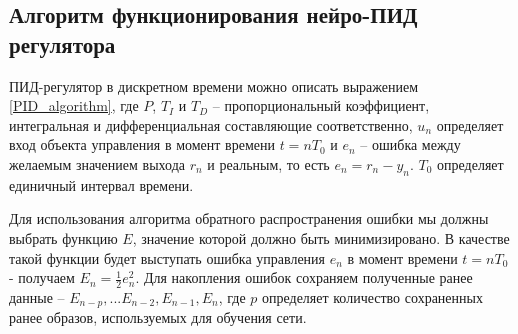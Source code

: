 \subsection{Алгоритм функционирования нейро-ПИД регулятора}

ПИД-регулятор в дискретном времени можно описать выражением \ref{PID_algorithm}, где $P$, $T_I$ и $T_D$ – пропорциональный коэффициент, интегральная и дифференциальная составляющие соответственно, $u_n$ определяет вход объекта управления в момент времени $t = n T_0$ и $e_n$ – ошибка между желаемым значением выхода $r_n$ и реальным, то есть $e_n = r_n - y_n$. $T_0$ определяет единичный интервал времени.

Для использования алгоритма обратного распространения ошибки мы должны выбрать функцию $E$, значение которой должно быть минимизировано. В качестве такой функции будет выступать ошибка управления $e_n$ в момент времени $t = n T_0$ - получаем $E_n = \frac{1}{2}e_n^2$.
Для накопления ошибок сохраняем полученные ранее данные – $E_{n-p},...E_{n-2},E_{n-1},E_n$, где $p$ определяет количество сохраненных ранее образов, используемых для обучения сети.

